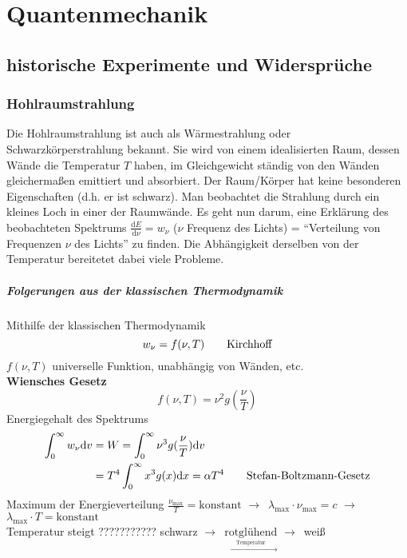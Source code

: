 \documentclass[oneside]{book}
\theoremstyle{definition}
\newcommand{\conseq}{$\rightarrow$~}
\renewcommand{\d}{\mathrm d}
\newcommand{\ddd}[2]{\frac{\d #1}{\d #2}}
\newcommand{\const}{\text{konstant}}
\begin{document}
\chapter{Quantenmechanik}
\section{historische Experimente und Widersprüche}
\subsection{Hohlraumstrahlung} Die Hohlraumstrahlung ist auch als Wärmestrahlung oder Schwarzkörperstrahlung bekannt. Sie wird von einem idealisierten Raum, dessen Wände die Temperatur $T$ haben, im Gleichgewicht ständig von den Wänden gleichermaßen emittiert und absorbiert. Der Raum/Körper hat keine besonderen Eigenschaften (d.h. er ist schwarz). Man beobachtet die Strahlung durch ein kleines Loch in einer der Raumwände. Es geht nun darum, eine Erklärung des beobachteten Spektrums $\ddd{E}{\nu} = w_\nu$ ($\nu$ Frequenz des Lichts) = "`Verteilung von Frequenzen $\nu$ des Lichts"' zu finden. Die Abhängigkeit derselben von der Temperatur bereitetet dabei viele Probleme.

\paragraph{Folgerungen aus der klassischen Thermodynamik}
Mithilfe der klassischen Thermodynamik
$$w_\nu = f(\nu, T) \text{\qquad Kirchhoff}$$
$f(\nu, T)$ universelle Funktion, unabhängig von Wänden, etc.\\
\textbf{Wiensches Gesetz}
$$f(\nu, T) = \nu^2 g(\frac{\nu}{T})$$
Energiegehalt des Spektrums
\begin{align*}
	\int_{0}^{\infty} w_\nu \d v &= W = \int_0^\infty \nu^3 g(\frac{\nu}{T}) \d v\\
	&= T^4 \int_0^\infty x^3 g(x) \d x = \alpha T^4 \text{\qquad Stefan-Boltzmann-Gesetz}
\end{align*}
Maximum der Energieverteilung  $\frac{\nu_\text{max}}{T} = \const$
\conseq $\lambda_\text{max} \cdot \nu_\text{max} = c$ \conseq $\lambda_\text{max} \cdot T = \const$\\
Temperatur steigt ??????????? schwarz \conseq $\underset{\xrightarrow{\text{Temperatur}}}{\text{rotglühend}}$ \conseq weiß\\
\end{document}
